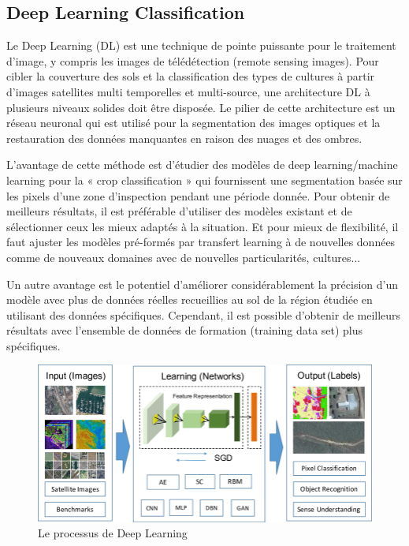 \documentclass[12pt, openany]{report}
\begin{document}
\subsection{Deep Learning Classification}
Le Deep Learning (DL) est une technique de pointe puissante pour le traitement d'image, y compris les images de télédétection (remote sensing images). 
Pour cibler la couverture des sols et la classification des types de cultures à partir d'images satellites multi temporelles et multi-source, une architecture DL à plusieurs niveaux solides doit être disposée. 
Le pilier de cette architecture est un réseau neuronal qui est utilisé pour la segmentation des images optiques et la restauration des données manquantes en raison des nuages et des ombres. \cite{deeplearning}

L’avantage de cette méthode est d’étudier des modèles de deep learning/machine learning pour la « crop classification » qui fournissent une segmentation basée sur les pixels d'une zone d'inspection pendant une période donnée. Pour obtenir de meilleurs résultats, il est préférable d’utiliser des modèles existant et de sélectionner ceux les mieux adaptés à la situation. Et pour mieux de flexibilité, il faut ajuster les modèles pré-formés par transfert learning à de nouvelles données comme de nouveaux domaines avec de nouvelles particularités, cultures...

Un autre avantage est le potentiel d'améliorer considérablement la précision d'un modèle avec plus de données réelles recueillies au sol de la région étudiée en utilisant des données spécifiques. Cependant, il est possible d'obtenir de meilleurs résultats avec l'ensemble de données de formation (training data set) plus spécifiques.

\begin{figure}[H]
\centering
\includegraphics[scale=0.5]{deep.png}
\caption{Le processus de Deep Learning}
\end{figure}
\end{document}
